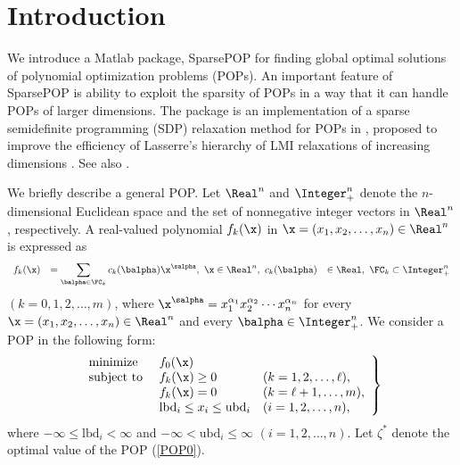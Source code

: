 \section{Introduction}

We introduce a Matlab package, SparsePOP for finding global optimal solutions of polynomial
optimization problems (POPs). An important feature of SparsePOP is ability to
exploit the sparsity of POPs in a way that it can handle  POPs of larger dimensions.
The package is an implementation
of a sparse semidefinite programming (SDP) relaxation method for POPs  in  \cite{WAKI04}, proposed
to improve
the efficiency of  Lasserre's hierarchy of LMI relaxations of increasing dimensions 
\cite{LAS01}. 
See also \cite{KIM03,KOJ03a}. 

 
We briefly describe a general POP. 
Let $\Real^n$ and $\Integer^n_+$  denote the $n$-dimensional
Euclidean space and the set of nonnegative integer vectors in $\Real^n$, respectively. 
A real-valued polynomial $f_k(\x)$ 
in $\x =(x_1,x_2,\ldots,x_n) \in \Real^n$ is expressed as
\[
	\begin{array}{lllll}
     f_k(\x) & = \displaystyle \sum_{\balpha \in \FC_k} c_k(\balpha) \x^{\salpha},\ \x \in \Real^n,   \
	 c_k(\balpha)  & \in \Real, \ 
	\FC_k  \subset \Integer_+^n
	\end{array}
\]
$(k=0,1,2,\ldots,m)$, where      
$\displaystyle \x^{\salpha} = x_1^{\alpha_1}x_2^{\alpha_2} \cdots
x_n^{\alpha_n}$ for every $\x =(x_1,x_2,\ldots,x_n) \in \Real^n$ and 
every $\balpha \in \Integer^n_+$.
We consider a POP in the following form: 
\begin{equation}
\left.
\begin{array}{llll}
\mbox{minimize } & f_0(\x) \\
\mbox{subject to } & f_k (\x) \geq 0 & (k=1,2,\ldots,\ell), \\
                                 & f_k(\x) = 0 & (k=\ell+1,\ldots,m), \\
                                 & \mbox{lbd}_i \leq x_i \leq \mbox{ubd}_i & (i=1,2,\ldots,n), 
\end{array}
\right\} \label{POP0}
\end{equation}
where $-\infty \leq  \mbox{lbd}_i < \infty$ and $-\infty <  \mbox{ubd}_i \leq \infty$ $(i=1,2,\ldots,n)$. 
Let $\zeta^*$ denote the optimal value of the POP (\ref{POP0}). 

